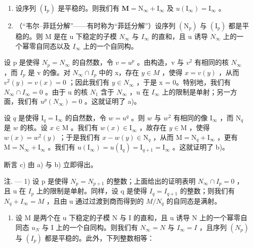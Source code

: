 \begin{enumerate}
\def\labelenumi{\alph{enumi})}
\setcounter{enumi}{1}
\item
  设序列 \((\mathrm{I}_p)\) 是平稳的。则我们有 \(\mathbf{M} = \mathrm{N}_{\infty} + \mathrm{I}_{\infty}\) 及 \(u(\mathrm{I}_{\infty}) = \mathrm{I}_{\infty}\) 。
\item
  （``韦尔--菲廷分解''——有时称为``菲廷分解''）设序列 \((\mathrm{N}_{p})\) 与 \((\mathrm{I}_{p})\) 都是平稳的。则 M 是在 u 下稳定的子模 \(N_{\infty}\) 与 \(I_{\infty}\) 的直和，且 u 诱导 \(N_{\infty}\) 上的一个幂零自同态以及 \(I_{\infty}\) 上的一个自同构。
\end{enumerate}

设 p 是使得 \(N_{p} = N_{\infty}\) 的自然数，令 \(v = u^{p}\) 。由构造，v 与 \(v^{2}\) 有相同的核 \(N_{\infty}\) ，而 \(I_{p}\) 是 v 的像。对 \(N_{\infty} \cap I_{p}\) 中的 x，存在 \(y \in M\) ，使得 \(x = v(y)\) ，从而 \(v^{2}(y) = v(x) = 0\) ；因此我们有 \(y \in N_{\infty}\) ，于是 x = 0。特别地，我们有 \(N_{\infty} \cap I_{\infty} = 0\) 。由于 u 的核 \(N_{1}\) 含于 \(N_{\infty}\) ，u 在 \(I_{\infty}\) 上的限制是单射；另一方面，我们有 \(u^{p}(N_{\infty}) = 0\) 。这就证明了 a)。

设 \(q\) 是使得 \(\mathrm{I}_q = \mathrm{I}_{\infty}\) 的自然数，令 \(w = u^q\) 。则 \(w\) 与 \(w^2\) 有相同的像 \(\mathrm{I}_{\infty}\) ，而 \(\mathrm{N}_q\) 是 \(w\) 的核。设 \(x \in \mathrm{M}\) 。我们有 \(w(x) \in \mathrm{I}_{\infty}\) ，故存在 \(y \in \mathrm{M}\) ，使得 \(w(x) = w^2(y)\) ；于是我们有 \(x - w(y) \in \mathrm{N}_q\) ，从而 \(\mathrm{M} = \mathrm{N}_q + \mathrm{I}_{\infty}\) ，更有 \(\mathrm{M} = \mathrm{N}_{\infty} + \mathrm{I}_{\infty}\) 。我们有 \(u(\mathrm{I}_{\infty}) = u(\mathrm{I}_q) = \mathrm{I}_{q+1} = \mathrm{I}_{\infty}\) 。这就证明了 b)。

断言 c) 由 a) 与 b) 立即得出。

注. --- 1) 设 p 是使得 \(N_{p} = N_{p+1}\) 的整数；上面给出的证明表明 \(N_{\infty} \cap I_{p} = 0\) ，且 u 在 \(I_{p}\) 上的限制是单射。同样，设 q 是使得 \(I_{q} = I_{q+1}\) 的整数；则我们有 \(N_{q} + I_{\infty} = M\) ，且由 u 通过过渡到商而得到的 \(M/N_{q}\) 的自同态是满射。

\begin{enumerate}
\def\labelenumi{\arabic{enumi})}
\setcounter{enumi}{1}
\tightlist
\item
  设 M 是两个在 u 下稳定的子模 N 与 I 的直和，且 u 诱导 N 上的一个幂零自同态 \(u_{N}\) 与 I 上的一个自同构。则我们有 \(N_{\infty} = N\) 与 \(I_{\infty} = I\) ，且序列 \((N_{p})\) 与 \((I_{p})\) 都是平稳的。此外，下列整数相等：
\end{enumerate}

